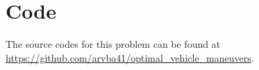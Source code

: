 \section{Code}

The source codes for this problem can be found at \newline \href{https://github.com/arvba41/optimal_vehicle_maneuvers/tree/main/uppgift/ugf2}{https://github.com/arvba41/optimal\_vehicle\_maneuvers}.


